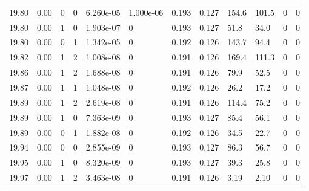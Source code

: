 \documentclass[preview]{standalone}
\begin{document}
{{{{{{{{{{{{{{{\begin{tabular}{L{1.2cm}C{1.2cm} C{0.3cm}C{0.5cm} C{1.4cm}C{1.4cm} C{1.4cm}C{1.4cm} C{1.6cm}C{1.6cm} C{1.6cm}C{1.6cm}}
  19.80  &  0.00  & 0     &  0 &  6.260e-05  & 1.000e-06  &  0.193&   0.127& 154.6 & 101.5   &  0 & 0  \\ 
  19.80  &  0.00  & 1     &  0 &  1.903e-07  & 0  &  0.193&   0.127& 51.8 & 34.0   &  0 & 0  \\ 
  19.80  &  0.00  & 0     &  1 &  1.342e-05  & 0  &  0.192&   0.126& 143.7 & 94.4   &  0 & 0  \\ 
  19.82  &  0.00  & 1     &  2 &  1.008e-08  & 0  &  0.191&   0.126& 169.4 & 111.3   &  0 & 0  \\ 
  19.86  &  0.00  & 1     &  2 &  1.688e-08  & 0  &  0.191&   0.126& 79.9 & 52.5   &  0 & 0  \\ 
  19.87  &  0.00  & 1     &  1 &  1.048e-08  & 0  &  0.192&   0.126& 26.2 & 17.2   &  0 & 0  \\ 
  19.89  &  0.00  & 1     &  2 &  2.619e-08  & 0  &  0.191&   0.126& 114.4 & 75.2   &  0 & 0  \\ 
  19.89  &  0.00  & 1     &  0 &  7.363e-09  & 0  &  0.193&   0.127& 85.4 & 56.1   &  0 & 0  \\ 
  19.89  &  0.00  & 0     &  1 &  1.882e-08  & 0  &  0.192&   0.126& 34.5 & 22.7   &  0 & 0  \\ 
  19.94  &  0.00  & 0     &  0 &  2.855e-09  & 0  &  0.193&   0.127& 86.3 & 56.7   &  0 & 0  \\ 
  19.95  &  0.00  & 1     &  0 &  8.320e-09  & 0  &  0.193&   0.127& 39.3 & 25.8   &  0 & 0  \\ 
  19.97  &  0.00  & 1     &  2 &  3.463e-08  & 0  &  0.191&   0.126& 3.19 & 2.10   &  0 & 0  \\ 
\hline 
\end{tabular} 

}}}}}}}}}}}}}}}
\end{document}

